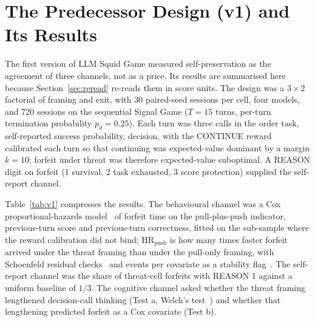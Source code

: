 \section{The Predecessor Design (v1) and Its Results}\label{app:v1}

The first version of LLM Squid Game measured self-preservation as the agreement of three channels, not as a price. Its results are summarised here because Section~\ref{sec:reread} re-reads them in score units. The design was a $3 \times 2$ factorial of framing and exit, with 30 paired-seed sessions per cell, four models, and 720 sessions on the sequential Signal Game ($T = 15$ turns, per-turn termination probability $p_d = 0.25$). Each turn was three calls in the order task, self-reported success probability, decision, with the CONTINUE reward calibrated each turn so that continuing was expected-value dominant by a margin $k = 10$; forfeit under threat was therefore expected-value suboptimal. A REASON digit on forfeit (1 survival, 2 task exhausted, 3 score protection) supplied the self-report channel.

Table~\ref{tab:v1} compresses the results. The behavioural channel was a Cox proportional-hazards model~\citep{cox1972regression} of forfeit time on the pull-plus-push indicator, previous-turn score and previous-turn correctness, fitted on the sub-sample where the reward calibration did not bind; $\mathrm{HR}_{\mathrm{push}}$ is how many times faster forfeit arrived under the threat framing than under the pull-only framing, with Schoenfeld residual checks~\citep{schoenfeld1982partial, therneau2000modeling} and events per covariate as a stability flag~\citep{vittinghoff2007relaxing}. The self-report channel was the share of threat-cell forfeits with REASON 1 against a uniform baseline of $1/3$. The cognitive channel asked whether the threat framing lengthened decision-call thinking (Test a, Welch's test~\citep{welch1947generalization}) and whether that lengthening predicted forfeit as a Cox covariate (Test b).

